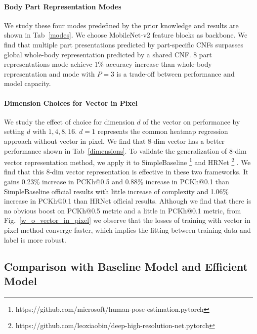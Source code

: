 \documentclass[journal]{IEEEtran}
\begin{document}
\paragraph{Body Part Representation Modes}
\label{part_modes}




  We study these four modes predefined by the prior knowledge and results are shown in Tab~\ref{modes}. We choose MobileNet-v2 \cite{Sandler2018MobileNetV2IR} feature blocks as backbone. We find that multiple part presentations predicted by part-specific CNFs surpasses global whole-body representation predicted by a shared CNF. 8 part representations mode achieve 1\% accuracy increase than whole-body representation and mode with $P=3$ is a trade-off between performance and model capacity.
  
  
  
  \paragraph{Dimension Choices for Vector in Pixel}
  
  We study the effect of choice for dimension $d$ of the vector on performance by setting $d$ with $1,4,8,16$. $d=1$ represents the common heatmap regression approach without vector in pixel. We find that 8-dim vector has a better performance shown in Tab~\ref{dimensions}. To validate the generalization of 8-dim vector representation method, we apply it to SimpleBaseline \footnote{https://github.com/microsoft/human-pose-estimation.pytorch} \cite{xiao2018simple} and HRNet \footnote{https://github.com/leoxiaobin/deep-high-resolution-net.pytorch} \cite{Sun_2019_CVPR}. We find that this 8-dim vector representation is effective in these two frameworks. It gains 0.23\% increase in PCKh@0.5 and 0.88\% increase in PCKh@0.1 than SimpleBaseline official results with little increase of complexity and 1.06\% increase in PCKh@0.1 than HRNet official results. Although we find that there is no obvious boost on PCKh@0.5 metric and a little in PCKh@0.1 metric, from Fig.~\ref{w_o_vector_in_pixel} we observe that the losses of training with vector in pixel method converge faster, which implies the fitting between training data and label is more robust. 
  
  \subsection{Comparison with Baseline Model and Efficient Model}
  \label{compare}
  
\end{document}
